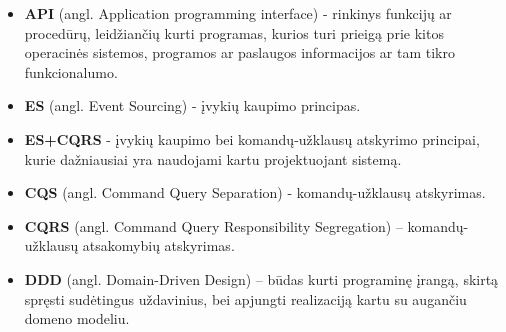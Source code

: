 \begin{itemize}

  \item \textbf{API} (angl. Application programming interface) - rinkinys funkcijų ar procedūrų, leidžiančių kurti programas, kurios turi prieigą prie kitos operacinės sistemos, programos ar paslaugos informacijos ar tam tikro funkcionalumo.

  \item \textbf{ES} (angl. Event Sourcing) - įvykių kaupimo principas.

  \item \textbf{ES+CQRS} - įvykių kaupimo bei komandų-užklausų atskyrimo principai, kurie dažniausiai yra naudojami kartu projektuojant sistemą.

  \item \textbf{CQS} (angl. Command Query Separation) - komandų-užklausų atskyrimas.

  \item \textbf{CQRS} (angl. Command Query Responsibility Segregation) – komandų-užklausų atsakomybių atskyrimas.

  \item \textbf{DDD} (angl. Domain-Driven Design) – būdas kurti programinę įrangą, skirtą spręsti sudėtingus uždavinius, bei apjungti realizaciją kartu su augančiu domeno modeliu.

\end{itemize}
